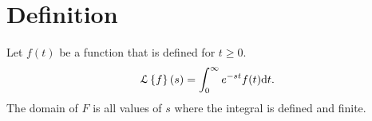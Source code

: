 \section{Definition}
\begin{definition}
	Let $f(t)$ be a function that is defined for $t \geq 0$.
	\begin{equation*}
		\mathcal{L}\left\{ f \right\}\left(s\right) = \int_{0}^{\infty}{e^{-st}f(t) \mathrm{d}t}.
	\end{equation*}
	The domain of $F$ is all values of $s$ where the integral is defined and finite.
\end{definition}

